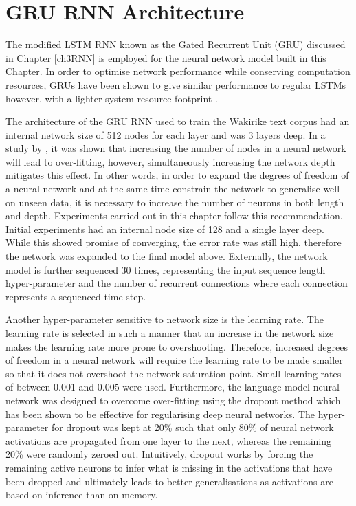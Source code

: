 \section{GRU RNN Architecture}
The modified LSTM RNN known as the Gated Recurrent Unit (GRU) discussed in Chapter \ref{ch3RNN} is employed for the neural network model built in this Chapter.  In order to optimise network performance while conserving computation resources, GRUs have been shown to give similar performance to regular LSTMs however, with a lighter system resource footprint \citep{cho2014learning}. 

The architecture of the GRU RNN used to train the Wakirike text corpus had an internal network size of 512 nodes for each layer and was 3 layers deep. In a study by \citep{goodfellow2013multi}, it was shown that increasing the number of nodes in a neural network will lead to over-fitting, however, simultaneously increasing the network depth mitigates this effect.  In other words, in order to expand the degrees of freedom of a neural network and at the same time constrain the network to generalise well on unseen data, it is necessary to increase the number of neurons in both length and depth.  Experiments carried out in this chapter follow this recommendation. Initial experiments had an internal node size of 128 and a single layer deep.  While this showed promise of converging, the error rate was still high, therefore the network was expanded to the final model above.   Externally, the network model is further  sequenced 30 times, representing the input sequence length hyper-parameter and the number of recurrent connections where each connection represents a sequenced time step. 

Another hyper-parameter sensitive to network size is the learning rate.  The learning rate is selected in such a manner that an increase in the network size makes the learning rate more prone to overshooting.  Therefore, increased degrees of freedom in a neural network will require the learning rate to be made smaller so that it does not overshoot the network saturation point.  Small learning rates of between 0.001 and 0.005 were used. Furthermore, the language model neural network was designed to overcome over-fitting using the dropout method \citep{srivastava2014dropout} which has been shown to be effective for regularising deep neural networks.  The hyper-parameter for dropout was kept at 20\% such that only 80\% of neural network activations are propagated from one layer to the next, whereas the remaining 20\% were randomly zeroed out.  Intuitively, dropout works by forcing the remaining active neurons to infer what is missing in the activations that have been dropped and ultimately leads to better generalisations as activations are based on inference than on memory.

